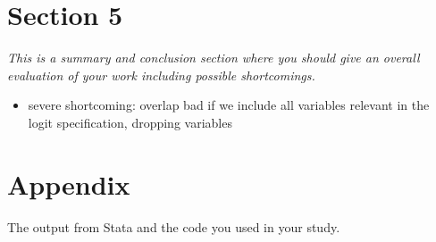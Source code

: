 \documentclass[11pt,a4paper,leqno]{article}
\begin{document}
\section*{Section 5} 
\textit{This is a summary and conclusion section where you should give an overall evaluation of your work including possible shortcomings.}
\begin{itemize}
	\item severe shortcoming: overlap bad if we include all variables relevant in the logit specification, dropping variables  
\end{itemize}

\nocite{chen2011}
\clearpage



\appendix
\section*{Appendix}
The output from Stata and the code you used in your study.
\end{document}
